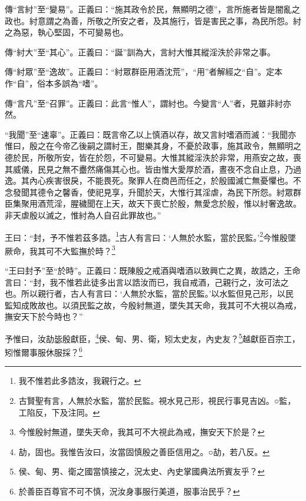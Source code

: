{\noindent\zhuan{}\fzbyks 傳“言紂”至“變易”。正義曰：“施其政令於民，無顯明之德”，言所施者皆是闇亂之政也。紂意謂之為善，所敬之所安之者，及其施行，皆是害民之事，為民所怨。紂之為惡，執心堅固，不可變易也。 \par}

{\noindent\zhuan{}\fzbyks 傳“紂大”至“其心”。正義曰：“誕”訓為大，言紂大惟其縱淫泆於非常之事。 \par}

{\noindent\zhuan{}\fzbyks 傳“紂眾”至“逸故”。正義曰：“紂眾群臣用酒沈荒”，“用”者解經之“自”。定本作“自”，俗本多誤為“嗜”。 \par}

{\noindent\zhuan{}\fzbyks 傳“言凡”至“召罪”。正義曰：此言“惟人”，謂紂也。今變言“人”者，見雖非紂亦然。 \par}

{\noindent\shu{}\fzkt “我聞”至“速辜”。正義曰：既言帝乙以上慎酒以存，故又言紂嗜酒而滅：“我聞亦惟曰，殷之在今帝乙後嗣之謂紂王，酣樂其身，不憂於政事，施其政令，無顯明之德於民，所敬所安，皆在於怨，不可變易。大惟其縱淫泆於非常，用燕安之故，喪其威儀，民見之無不衋然痛傷其心也。皆由惟大愛厚於酒，晝夜不念自止息，乃過逸。其內心疾害很戾，不能畏死。聚罪人在商邑而任之，於殷國滅亡無憂懼也。不念發聞其德令之馨香，使祀見享，升聞於天，大惟行其淫虐，為民下所怨。紂眾群臣集聚用酒荒淫，腥穢聞在上天，故天下喪亡於殷，無愛念於殷，惟以紂奢逸故。非天虐殷以滅之，惟紂為人自召此罪故也。” \par}

王曰：“封，予不惟若茲多誥。\footnote{我不惟若此多誥汝，我親行之。}古人有言曰：‘人無於水監，當於民監。’\footnote{古賢聖有言，人無於水監，當於民監。視水見己形，視民行事見吉凶。○監，工陷反，下及注同。}今惟殷墜厥命，我其可不大監撫於時？\footnote{今惟殷紂無道，墜失天命，我其可不大視此為戒，撫安天下於是？}

{\noindent\shu{}\fzkt “王曰封予”至“於時”。正義曰：既陳殷之戒酒與嗜酒以致興亡之異，故誥之，王命言曰：“封，我不惟若此徒多出言以誥汝而已，我自戒酒，己親行之，汝可法之也。所以親行者，古人有言曰：‘人無於水監，當於民監。’以水監但見己形，以民監知成敗故也。以須民監之故，今殷紂無道，墜失其天命，我其可不大視以為戒，撫安天下於今時也？” \par}

予惟曰，汝劼毖殷獻臣，\footnote{劼，固也。我惟告汝曰，汝當固慎殷之善臣信用之。○劼，若八反。}侯、甸、男、衛，矧太史友，內史友？\footnote{侯、甸、男、衛之國當慎接之，況太史、內史掌國典法所賓友乎？}越獻臣百宗工，矧惟爾事服休服採？\footnote{於善臣百尊官不可不慎，況汝身事服行美道，服事治民乎？}



